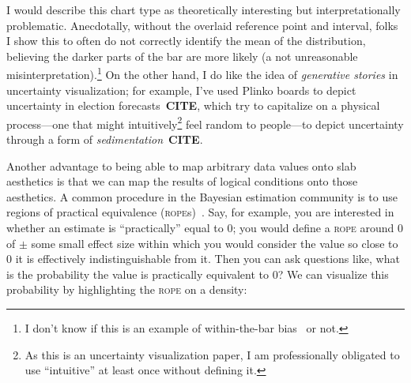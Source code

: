 \documentclass[journal]{vgtc}                     %
\begin{document}
I would describe this chart type as theoretically interesting but interpretationally problematic. Anecdotally, without the overlaid reference point and interval, folks I show this to often do not correctly identify the mean of the distribution, believing the darker parts of the bar are more likely (a not unreasonable misinterpretation).\footnote{I don't know if this is an example of within-the-bar bias~\cite{newman2012bar} or not.} On the other hand, I do like the idea of \textit{generative stories} in uncertainty visualization; for example, I've used Plinko boards to depict uncertainty in election forecasts~\textbf{CITE}, which try to capitalize on a physical process---one that might intuitively\footnote{As this is an uncertainty visualization paper, I am professionally obligated to use ``intuitive'' at least once without defining it.} feel random to people---to depict uncertainty through a form of \textit{sedimentation}~\textbf{CITE}.

Another advantage to being able to map arbitrary data values onto slab aesthetics is that we can map the results of logical conditions onto those aesthetics. A common procedure in the Bayesian estimation community is to use regions of practical equivalence (\textsc{rope}s)~\cite{kruschke2018rejecting}. Say, for example, you are interested in whether an estimate is ``practically'' equal to 0; you would define a \textsc{rope} around 0 of $\pm$ some small effect size within which you would consider the value so close to 0 it is effectively indistinguishable from it. Then you can ask questions like, what is the probability the value is practically equivalent to 0? We can visualize this probability by highlighting the \textsc{rope} on a density:
\end{document}
